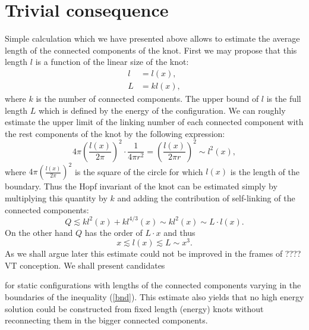 \documentclass[a4paper,12pt]{article}
\begin{document}

\section{Trivial consequence}
	Simple calculation which we have presented above allows
	to estimate the average length of the connected components
	of the knot. First we may propose that this length 
    $ l $
	is a function of the linear size of the knot:
\begin{align}
    l & = l(x), \\
    L & = k l(x) ,
\end{align}
	where 
    $ k $
	is the number of connected components.
	The upper bound of 
    $ l $ 
	is the full length 
    $ L $
	which is defined by the energy of the configuration.
	We can roughly estimate the upper limit of the linking
	number of each connected component with the rest components
	of the knot by the following expression:
\begin{equation}
    4 \pi (\frac{l(x)}{2 \pi})^{2} \cdot \frac{1}{4 \pi r^{2}} =
	(\frac{l(x)}{2 \pi r})^{2} \sim l^{2}(x) ,
\end{equation}
	where 
    $ 4 \pi (\frac{l(x)}{2 \pi})^{2} $
	is the square of the circle for which 
    $ l(x) $
	is the length of the boundary.
	Thus the Hopf invariant of the knot can be estimated simply by
	multiplying this quantity by 
    $ k $
	and adding the contribution of self-linking of the
	connected components:
\begin{equation}
    Q \lesssim k l^{2}(x) + k l^{4/3}(x) \sim k l^{2}(x) \sim L \cdot l(x) .
\end{equation}
	On the other hand
    $ Q $
	has the order of 
    $ L \cdot x $
	and thus
\begin{equation}
\label{bnd}
    x \lesssim l(x) \lesssim L \sim x^{3} .
\end{equation}
	As we shall argue later this estimate could not be improved
	in the frames of 
????
VT conception. We shall present candidates

	for static configurations with lengths of the connected
	components varying in the boundaries of the inequality
(\ref{bnd}).
	This estimate also yields that no high energy solution
	could be constructed from fixed length (energy) knots without
	reconnecting them in the bigger connected components.
\end{document}
